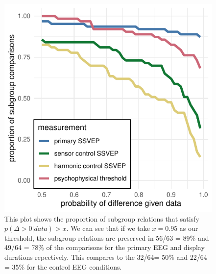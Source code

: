 \documentclass[9pt,twocolumn,twoside,lineno]{pnas-new}
\begin{document}
\begin{figure}[tbp]
\centering
\includegraphics[width=1\linewidth]{../analysis/plots/model_roc_style.pdf}
\caption{This plot shows the proportion of subgroup relations that satisfy $p(\Delta >0 | data) > x$. We can see that if we take $x = 0.95$ as our threshold, the subgroup relations are preserved in 56/63 = 89\% and 49/64 = 78\% of the comparisons for the primary EEG and display durations repectively. This compares to the 32/64= 50\% and 22/64 = 35\% for the control EEG conditions.}
\label{fig:durations_rotations}
\end{figure}



\end{document}
